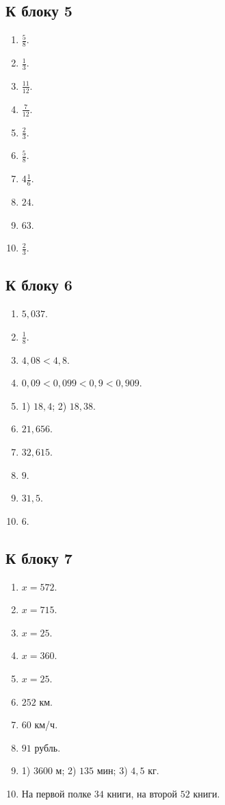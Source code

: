 \documentclass[12pt,a4paper]{article}
\begin{document}
\subsection*{К блоку 5}
\begin{enumerate}
  \item $\frac58$.
  \item $\frac13$.
  \item $\frac{11}{12}$.
  \item $\frac7{12}$.
  \item $\frac23$.
  \item $\frac58$.
  \item $4\frac16$.
  \item $24$.
  \item $63$.
  \item $\frac23$.
\end{enumerate}

\subsection*{К блоку 6}
\begin{enumerate}
  \item $5{,}037$.
  \item $\frac18$.
  \item $4{,}08<4{,}8$.
  \item $0{,}09<0{,}099<0{,}9<0{,}909$.
  \item 1) $18{,}4$; 2) $18{,}38$.
  \item $21{,}656$.
  \item $32{,}615$.
  \item $9$.
  \item $31{,}5$.
  \item $6$.
\end{enumerate}

\subsection*{К блоку 7}
\begin{enumerate}
  \item $x=572$.
  \item $x=715$.
  \item $x=25$.
  \item $x=360$.
  \item $x=25$.
  \item $252$ км.
  \item $60$ км/ч.
  \item $91$ рубль.
  \item 1) $3600$ м; 2) $135$ мин; 3) $4{,}5$ кг.
  \item На первой полке $34$ книги, на второй $52$ книги.
\end{enumerate}
\end{document}
